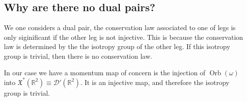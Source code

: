 \documentclass[12pt]{amsart}
\newcommand{\R}{\ensuremath{\mathbb{R}}}
\DeclareMathOperator{\Jet}{Jet}
\DeclareMathOperator{\Orb}{Orb}
\begin{document}


\subsection{Why are there no dual pairs?}
\label{sec:dual_pairs}
We one considers a dual pair, the conservation law associated
to one of legs is only siginificant if the other leg is not injective.
This is because the conservation law is determined by the the isotropy group
of the other leg.  If this isotropy group is trivial, then there is no
conservation law.

In our case we have a momentum map of concern is the injection of $\Orb(\omega)$ into $\mathfrak{X}^*(\R^2) \equiv \mathcal{D}'(\R^2)$.
It is an injective map, and therefore the isotropy group is trivial.


\end{document}
